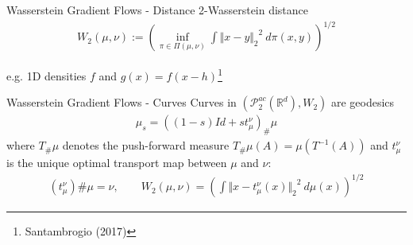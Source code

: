 \documentclass[aspectratio=149]{beamer}
\def\real{\mathbb{R}}
\newcommand{\norm}[2]{\ensuremath{\Vert #1 \Vert_{#2}}}
\begin{document}
\begin{frame}{Wasserstein Gradient Flows - Distance}
2-Wasserstein distance
\begin{align*}
W_{2}(\mu,\nu):=\left(\inf_{\pi\in\Pi(\mu,\nu)}\int\norm{x-y}{2}^{2}\ d\pi(x,y)\right)^{1/2}
\end{align*}

e.g. 1D densities $f$ and $g(x)=f(x-h)$\footnote{Santambrogio (2017)}
\begin{figure}
\centering
{}
\end{figure}

\end{frame}


\begin{frame}{Wasserstein Gradient Flows - Curves}
Curves in $\left(\mathcal{P}_{2}^{ac}(\real^{d}), W_2\right)$ are geodesics
\begin{align*}
\mu_s=((1-s)Id+st_{\mu}^{\nu})_{\#}\mu
\end{align*}
where $T_{\#}\mu$ denotes the push-forward measure $T_{\#}\mu(A)=\mu(T^{-1}(A))$
and $t_{\mu}^{\nu}$ is the unique optimal transport map between $\mu$ and $\nu$:
\begin{align*}
(t_{\mu}^{\nu}){\#}\mu=\nu,\qquad W_{2}(\mu,\nu)=\left(\int\norm{x-t_{\mu}^{\nu}(x)}{2}^{2}\ d\mu(x)\right)^{1/2}
\end{align*}
\end{frame}
\end{document}
